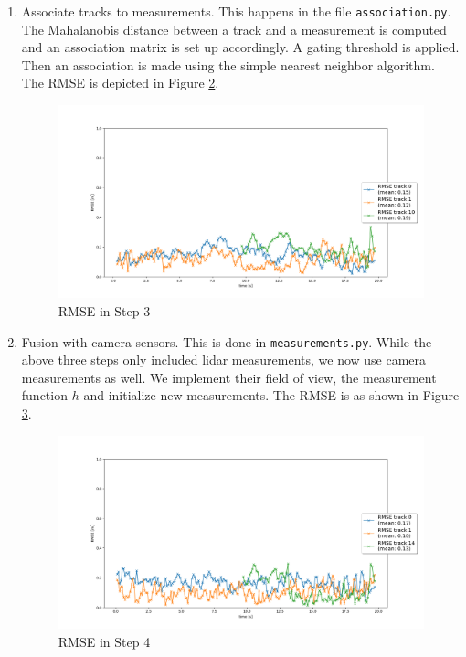 \documentclass[11pt, a4paper]{amsart}
\begin{document}
\begin{enumerate}
\begin{figure}
			\caption{RMSE in Step 2}
			\label{RMSE2}
		\end{figure}
		\item Associate tracks to measurements. This happens in the file \texttt{association.py}. The Mahalanobis distance between a track and a measurement is computed and an association matrix is set up accordingly. A gating threshold is applied. Then an association is made using the simple nearest neighbor algorithm. The RMSE is depicted in Figure \ref{RMSE3}.
		\begin{figure}
			\includegraphics[scale=0.4]{../images_output/RMSE3.png}
			\caption{RMSE in Step 3}
			\label{RMSE3}
		\end{figure}
		\item Fusion with camera sensors. This is done in \texttt{measurements.py}. While the above three steps only included lidar measurements, we now use camera measurements as well. We implement their field of view, the measurement function $h$ and initialize new measurements. The RMSE is as shown in Figure \ref{RMSE4}.
		\begin{figure}
			\includegraphics[scale=0.4]{../images_output/RMSE4.png}
			\caption{RMSE in Step 4}
			\label{RMSE4}
		\end{figure}
	\end{enumerate}
	
\end{document}

